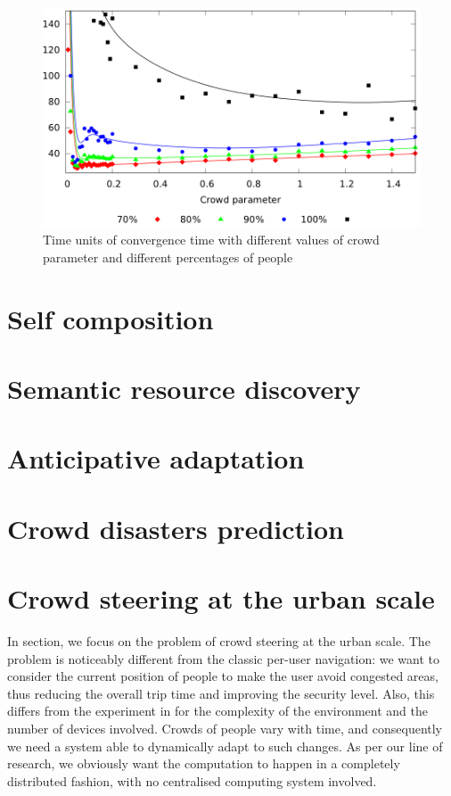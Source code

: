 \documentclass[12pt,a4paper,twoside,openright]{book}
\begin{document}
\begin{figure}
\begin{center}
   \includegraphics[width=0.99\columnwidth]{img/jos-graph}
   \vspace{-10pt}\caption{Time units of convergence time with different values of crowd parameter and different percentages of people}\label{img:jos-graph}\vspace{-10pt}
\end{center}
\end{figure}


\section{Self composition}
\section{Semantic resource discovery}
\section{Anticipative adaptation}
\label{anticipative-gradient}

\section{Crowd disasters prediction}
\section{Crowd steering at the urban scale}
\label{ahpc-steering}
In section, we focus on the problem of crowd steering at the urban scale.
%
The problem is noticeably different from the classic per-user navigation: we want to consider the current position of people to make the user avoid congested areas, thus reducing the overall trip time and improving the security level.
%
Also, this differs from the experiment in  for the complexity of the environment and the number of devices involved.
%
Crowds of people vary with time, and consequently we need a system able to dynamically adapt to such changes.
%
As per our line of research, we obviously want the computation to happen in a completely distributed fashion, with no centralised computing system involved.
\end{document}
